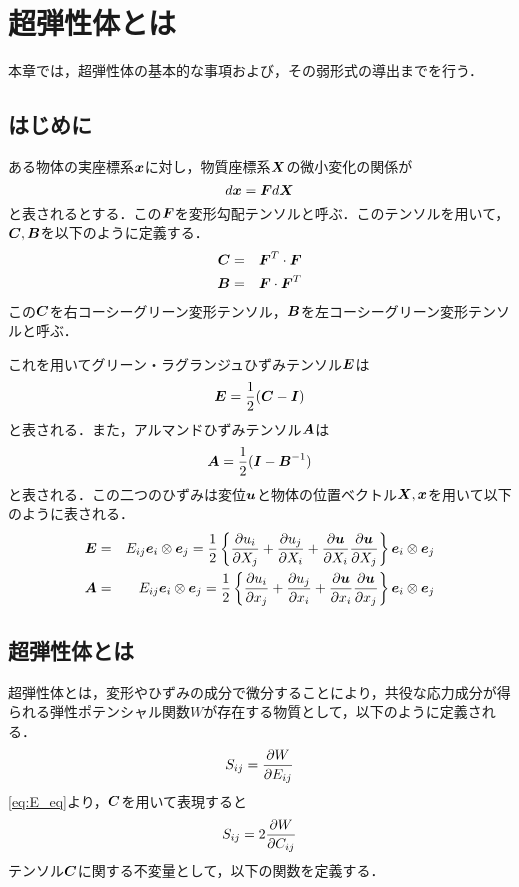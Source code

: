 \section{超弾性体とは}
本章では，超弾性体の基本的な事項および，その弱形式の導出までを行う．
\subsection{はじめに}
ある物体の実座標系$ \bd{x} $に対し，物質座標系$ \bd{X} $の微小変化の関係が
\begin{equation}\label{eq:FloryTensor}
	d\bd{x} = \bd{F}d\bd{X}
\end{equation}
と表されるとする．この$ \bd{F} $を変形勾配テンソルと呼ぶ．このテンソルを用いて，$ \bd{C},\bd{B} $を以下のように定義する．
\begin{eqnarray}\label{eq:CandB_Define}
	\bd{C} &=& \bd{F}^T \cdot \bd{F} \\
	\bd{B} &=& \bd{F} \cdot \bd{F}^T
\end{eqnarray}
この$ \bd{C} $を右コーシーグリーン変形テンソル，$ \bd{B} $を左コーシーグリーン変形テンソルと呼ぶ．

これを用いてグリーン・ラグランジュひずみテンソル$ \bd{E} $は
\begin{equation}\label{eq:E_eq}
	\bd{E}=\frac{1}{2} (\bd{C}-\bd{I})
\end{equation}
と表される．また，アルマンドひずみテンソル$ \bd{A} $は
\begin{equation}\label{eq:Aeq}
	\bd{A} = \frac{1}{2} (\bd{I}-\bd{B}^{-1})
\end{equation}
と表される．この二つのひずみは変位$ \bd{u} $と物体の位置ベクトル$ \bd{X},\bd{x} $を用いて以下のように表される．
\begin{eqnarray}\label{eq:E_Deri}
	\bd{E} &=& E_{ij} \bd{e}_i \otimes \bd{e}_j = \frac{1}{2} \left\{ \partdf{u_i}{X_j} + \partdf{u_j}{X_i} + \partdf{\bd{u}}{X_i} \partdf{\bd{u}}{X_j} \right\} \bd{e}_i \otimes \bd{e}_j \\
	\bd{A} &=& E_{ij} \bd{e}_i \otimes \bd{e}_j = \frac{1}{2} \left\{ \partdf{u_i}{x_j} + \partdf{u_j}{x_i} + \partdf{\bd{u}}{x_i} \partdf{\bd{u}}{x_j} \right\} \bd{e}_i \otimes \bd{e}_j
\end{eqnarray}
\subsection{超弾性体とは}
超弾性体とは，変形やひずみの成分で微分することにより，共役な応力成分が得られる弾性ポテンシャル関数$ W $が存在する物質として，以下のように定義される．
\begin{equation}\label{eq:StrainEq}
	S_{ij} = \partdf{W}{E_{ij}}
\end{equation}
\eqref{eq:E_eq}より，$ \bd{C} $を用いて表現すると
\begin{equation}\label{eq:StrainEq2}
	S_{ij} = 2\partdf{W}{C_{ij}}
\end{equation}
テンソル$ \bd{C} $に関する不変量として，以下の関数を定義する．

